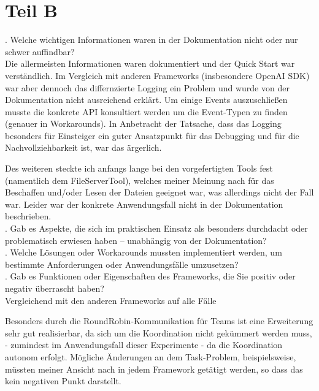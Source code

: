 \documentclass{article}
\begin{document}
\noindent
{}

\section*{Teil B}

\noindent
{}

. Welche wichtigen Informationen waren in der Dokumentation nicht oder nur schwer
auffindbar? \\

Die allermeisten Informationen waren dokumentiert und der Quick Start war verständlich. 
Im Vergleich mit anderen Frameworks (insbesondere OpenAI SDK) war aber dennoch das differnzierte 
Logging ein Problem und wurde von der Dokumentation nicht ausreichend erklärt. Um einige Events 
auszuschließen musste die konkrete API konsultiert werden um die Event-Typen zu finden 
(genauer in Workarounds). In Anbetracht der Tatsache, dass das Logging besonders für Einsteiger
ein guter Ansatzpunkt für das Debugging und für die Nachvollziehbarkeit ist, war das ärgerlich. 

Des weiteren steckte ich anfangs lange bei den vorgefertigten Tools fest (namentlich dem FileServerTool),
welches meiner Meinung nach für das Beschaffen und/oder Lesen der Dateien geeignet war, was allerdings
nicht der Fall war. Leider war der konkrete Anwendungsfall nicht in der Dokumentation beschrieben. \\

. Gab es Aspekte, die sich im praktischen Einsatz als besonders durchdacht oder
problematisch erwiesen haben – unabhängig von der Dokumentation? \\

. Welche Lösungen oder Workarounds mussten implementiert werden, um bestimmte
Anforderungen oder Anwendungsfälle umzusetzen? \\


. Gab es Funktionen oder Eigenschaften des Frameworks, die Sie positiv oder negativ
überrascht haben? \\
Vergleichend mit den anderen Frameworks auf alle Fälle 

\noindent
{}
Besonders durch die RoundRobin-Kommunikation für Teams ist eine Erweiterung sehr gut realisierbar, da
sich um die Koordination nicht gekümmert werden muss, - zumindest im Anwendungsfall dieser Experimente - 
da die Koordination autonom erfolgt. Mögliche Änderungen an dem Task-Problem, beispielsweise, müssten meiner
Ansicht nach in jedem Framework getätigt werden, so dass das kein negativen Punkt darstellt. \\
\end{document}
